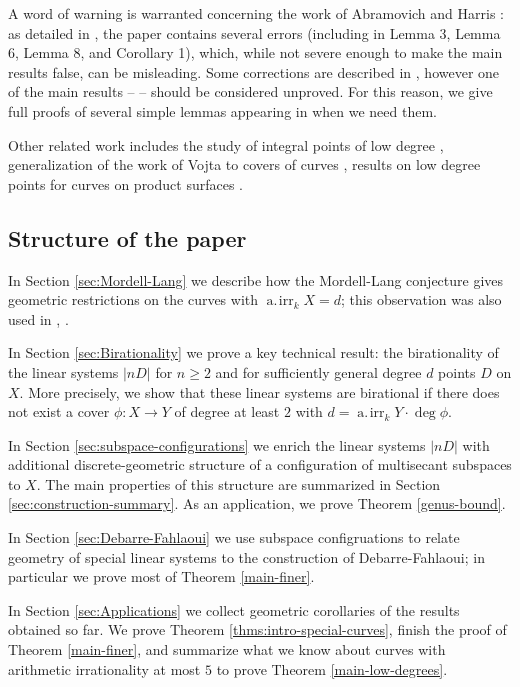 \documentclass[11pt]{amsart}
\newcommand{\airr}{\operatorname{a.\!irr}}
\theoremstyle{definition}
\theoremstyle{remark}
\begin{document}
A word of warning is warranted concerning the work of Abramovich and Harris \cite{Abramovich-Harris1991}: as detailed in \cite{Debarre-Fahlaoui1993}, the paper contains several errors (including in Lemma 3, Lemma 6, Lemma 8, and Corollary 1), which, while not severe enough to make the main results false, can be misleading.
 Some corrections are described in \cite{Debarre-Fahlaoui1993}, however one of the main results -- \cite[Theorem 2]{Abramovich-Harris1991} --  should be considered unproved. For this reason, we give full proofs of several simple lemmas appearing in \cite{Abramovich-Harris1991} when we need them. 

Other related work includes the study of integral points of low degree \cite{levin2016}, generalization of the work of Vojta to covers of curves \cite{song-tucker2001}, results on low degree points for curves on product surfaces \cite{levin2007}.

\subsection{Structure of the paper}

In Section \ref{sec:Mordell-Lang} we describe how the Mordell-Lang conjecture gives geometric restrictions on the curves with $\airr_k X = d$; this observation was also used in \cite{Harris-Silverman1991}, \cite{Abramovich-Harris1991}.

In Section \ref{sec:Birationality} we prove a key technical result: the birationality of the linear systems $|nD|$ for $n \geqslant 2$ and for sufficiently general degree $d$ points $D$ on $X$. More precisely, we show that these linear systems are birational if there does not exist a cover $\phi \colon X \to Y$ of degree at least $2$ with $d=\airr_k Y \cdot \deg \phi.$

In Section \ref{sec:subspace-configurations} we enrich the linear systems $|nD|$ with additional discrete-geometric structure of a configuration of multisecant subspaces to $X$. The main properties of this structure are summarized in Section \ref{sec:construction-summary}. As an application, we prove Theorem \ref{genus-bound}.

In Section \ref{sec:Debarre-Fahlaoui} we use subspace configruations to relate geometry of special linear systems to the construction of Debarre-Fahlaoui; in particular we prove most of Theorem \ref{main-finer}.

In Section \ref{sec:Applications} we collect geometric corollaries of the results obtained so far. We prove Theorem \ref{thms:intro-special-curves}, finish the proof of Theorem \ref{main-finer}, and summarize what we know about curves with arithmetic irrationality at most $5$ to prove Theorem \ref{main-low-degrees}.
\end{document}
